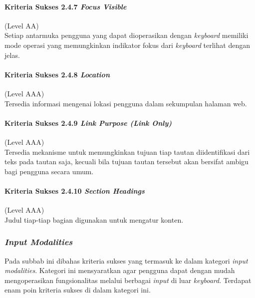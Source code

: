 \paragraph{Kriteria Sukses 2.4.7 \textit{Focus Visible}}
\label{sec:kriteria_sukses_2.4.7}
(Level AA)\\

Setiap antarmuka pengguna yang dapat dioperasikan dengan \textit{keyboard} memiliki mode operasi yang memungkinkan indikator fokus dari \textit{keyboard} terlihat dengan jelas.

\paragraph{Kriteria Sukses 2.4.8 \textit{Location}}
\label{sec:kriteria_sukses_2.4.8}
(Level AAA)\\

Tersedia informasi mengenai lokasi pengguna dalam sekumpulan halaman web.

\paragraph{Kriteria Sukses 2.4.9 \textit{Link Purpose (Link Only)}}
\label{sec:kriteria_sukses_2.4.9}
(Level AAA)\\

Tersedia mekanisme untuk memungkinkan tujuan tiap tautan diidentifikasi dari teks pada tautan saja, kecuali bila tujuan tautan tersebut akan bersifat ambigu bagi pengguna secara umum.

\paragraph{Kriteria Sukses 2.4.10 \textit{Section Headings}}
\label{sec:kriteria_sukses_2.4.10}
(Level AAA)\\

Judul tiap-tiap bagian digunakan untuk mengatur konten.

\subsubsection{\textit{Input Modalities}}
\label{sec:input_modalities}
Pada subbab ini dibahas kriteria sukses yang termasuk ke dalam kategori \textit{input modalities}. Kategori ini mensyaratkan agar pengguna dapat dengan mudah mengoperasikan fungsionalitas melalui berbagai \textit{input} di luar \textit{keyboard}. Terdapat enam poin kriteria sukses di dalam kategori ini.

